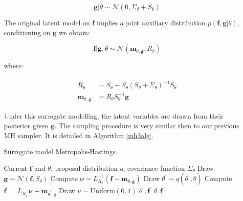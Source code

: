 \documentclass[10pt,a4paper,twoside]{book}
\begin{document}
\begin{equation}
\boldsymbol{g}|\theta \sim \mathcal{N}(0, \Sigma_\theta + S_\theta)
\end{equation}

The original latent model on $\boldsymbol{f}$ implies a joint auxiliary distribution $p(\boldsymbol{f}, \boldsymbol{g}|\theta)$, conditioning on $\boldsymbol{g}$ we obtain:

\begin{equation}
\boldsymbol{f}|\boldsymbol{g}, \theta \sim \mathcal{N}(\boldsymbol{m}_{\theta, \boldsymbol{g}}, R_{\theta})
\end{equation}

where:

\begin{align}
\begin{split}
R_{\theta} &= S_{\theta} - S_{\theta}(S_{\theta} + \Sigma_{\theta})^{-1} S_\theta\\
\boldsymbol{m}_{\theta, \boldsymbol{g}} &= R_\theta S_\theta^{-1}\boldsymbol{g}
\end{split}
\end{align}

Under this surrogate modelling, the latent variables are drawn from their posterior given $\boldsymbol{g}$. The sampling procedure is very similar then to our previous MH sampler. It is detailed in Algorithm \ref{mh3alg}.

\begin{algorithm}
	\caption{Surrogate model Metropolis-Hastings.}
		\label{mh3alg}
		\begin{algorithmic}[1]
		\Require Current $\boldsymbol{f}$ and $\theta$, proposal distribution $q$, covariance function $\Sigma_\theta$ 
		\State Draw $\boldsymbol{g}\sim \mathcal{N}(\boldsymbol{f}, S_\theta)$
		\State Compute $\boldsymbol{\nu} = L_{R_\theta}^{-1}(\boldsymbol{f} - \boldsymbol{m}_{\theta, \boldsymbol{g}})$
		\State Draw $\theta^{'} \sim q(\theta^{'}, \theta)$
		\State Compute $\boldsymbol{f}^{'} = L_{R_{\theta^{'}}}\boldsymbol{\nu}  +  \boldsymbol{m}_{\theta^{'}, \boldsymbol{g}}$
		\State Draw $u\sim \mathrm{Uniform}(0, 1)$
		\Return $\theta^{'}, \boldsymbol{f}^{'}$
		\Else\;
		\Return $\theta, \boldsymbol{f}$
		\EndIf
		\end{algorithmic}
\end{algorithm}
\end{document}
